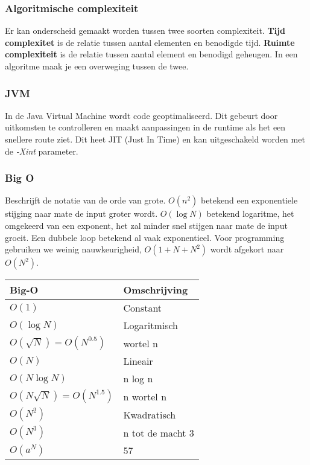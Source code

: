 \subsubsection{Algoritmische complexiteit}
Er kan onderscheid gemaakt worden tussen twee soorten complexiteit.
\textbf{Tijd complexitet} is de relatie tussen aantal elementen en benodigde tijd.
\textbf{Ruimte complexiteit} is de relatie tussen aantal element en benodigd geheugen.
In een algoritme maak je een overweging tussen de twee.

\subsubsection{JVM}
In de Java Virtual Machine wordt code geoptimaliseerd.
Dit gebeurt door uitkomsten te controlleren en maakt aanpassingen in de runtime als het een snellere route ziet.
Dit heet JIT (Just In Time) en kan uitgeschakeld worden met de \textit{-Xint} parameter.

\subsubsection{Big O}
Beschrijft de notatie van de orde van grote.
$O(n^2)$ betekend een exponentiele stijging naar mate de input groter wordt.
$O(\log N)$ betekend logaritme, het omgekeerd van een exponent, het zal minder snel stijgen naar mate de input groeit.
Een dubbele loop betekend al vaak exponentieel.
Voor programming gebruiken we weinig nauwkeurigheid, $O(1+N+N^2)$ wordt afgekort naar $O(N^2)$.

\begin{center}
    \begin{tabular}{ll}
        Big-O                           & Omschrijving \\
        \midrule
        $O(1)$                          & Constant \\
        $O(\log N)$                     & Logaritmisch \\
        $O(\sqrt{N}) = O(N^{0.5})$      & wortel n \\
        $O(N)$                          & Lineair \\
        $O(N \log N)$                   & n log n \\
        $O(N \sqrt{N}) = O(N^{1.5})$    & n wortel n \\
        $O(N^2)$                        & Kwadratisch \\
        $O(N^3)$                        & n tot de macht 3 \\
        $O(a^N)$                        & 57 \\
        \bottomrule
    \end{tabular}
\end{center}
